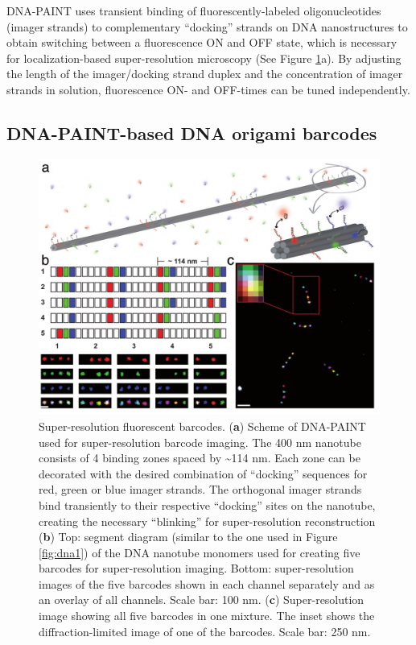 DNA-PAINT uses transient binding of fluorescently-labeled oligonucleotides 
(imager strands) to complementary “docking” strands on DNA nanostructures to obtain 
switching between a fluorescence ON and OFF state, which is necessary for 
localization-based super-resolution microscopy (See Figure \ref{fig:dna4}a). By adjusting the length of 
the imager/docking strand duplex and the concentration of imager strands in solution, 
fluorescence ON- and OFF-times can be tuned independently.

\subsection{DNA-PAINT-based DNA origami barcodes}
\begin{figure} %
\includegraphics[width=\textwidth]{figures/dna4}
\caption[Super-resolution fluorescent barcodes.]{Super-resolution fluorescent barcodes.
 (\textbf{a}) Scheme of DNA-PAINT used for 
super-resolution barcode imaging. The 400 nm nanotube consists of 4 binding zones 
spaced by \textasciitilde114 nm. Each zone can be decorated with the desired combination of 
“docking” sequences for red, green or blue imager strands. The orthogonal imager strands 
bind transiently to their respective “docking” sites on the nanotube, creating the 
necessary “blinking” for super-resolution reconstruction (\textbf{b}) Top: segment diagram 
(similar to the one used in Figure \ref{fig:dna1}) of the DNA nanotube monomers used for creating 
five barcodes for super-resolution imaging. Bottom: super-resolution images of the five 
barcodes shown in each channel separately and as an overlay of all channels. Scale bar: 
100 nm. (\textbf{c}) Super-resolution image showing all five barcodes in one mixture. The inset 
shows the diffraction-limited image of one of the barcodes. Scale bar: 250 nm.
\label{fig:dna4}}
\end{figure}


